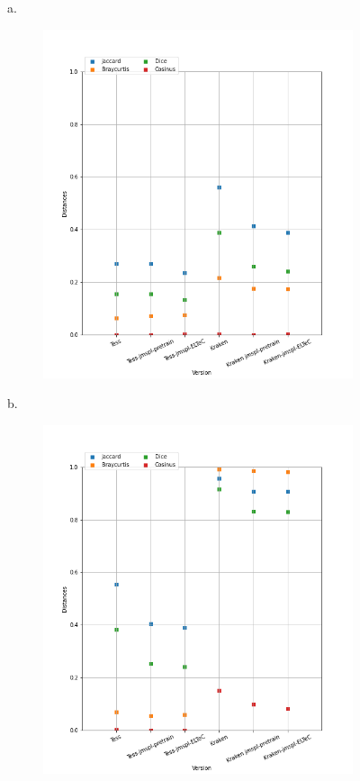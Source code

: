 \begin{figure}
\begin{minipage}{7cm}
a.\
\begin{subfigure}{0.99\textwidth}
 \includegraphics[height=.99\textwidth]{IMAGES/ELTeC_DISTANCES_spaCy3.5.1/TROLLOPE-graph-dist-spaCy3.5.1-txt.png}
  \label{fig:TROLLOPE-graph-dist-spaCy3.5.1-txt}
  \end{subfigure}
  \end{minipage}
\begin{minipage}{7cm}
b.\
  \begin{subfigure}{0.99\textwidth}
  \includegraphics[height=.99\textwidth]{IMAGES/ELTeC_DISTANCES_spaCy3.5.1/REYNOLDS-The-Mysteries-of-London-graph-dist-spaCy3.5.1-txt.png} 

\end{subfigure}
\end{minipage}
\end{figure}
